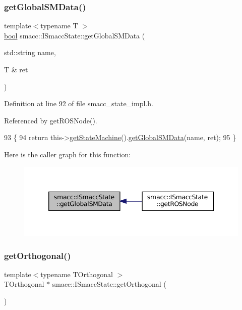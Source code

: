 \subsubsection{\texorpdfstring{get\+Global\+S\+M\+Data()}{getGlobalSMData()}}
{\footnotesize\ttfamily template$<$typename T $>$ \\
\hyperlink{classbool}{bool} smacc\+::\+I\+Smacc\+State\+::get\+Global\+S\+M\+Data (\begin{DoxyParamCaption}\item[{std\+::string}]{name,  }\item[{T \&}]{ret }\end{DoxyParamCaption})}



Definition at line 92 of file smacc\+\_\+state\+\_\+impl.\+h.



Referenced by get\+R\+O\+S\+Node().


\begin{DoxyCode}
93 \{
94     \textcolor{keywordflow}{return} this->\hyperlink{classsmacc_1_1ISmaccState_a562bb3f9a3ac16b8be71e4794c9e7523}{getStateMachine}().\hyperlink{classsmacc_1_1ISmaccStateMachine_aeda2d6813c6c428bf318a5792e014b61}{getGlobalSMData}(name, ret);
95 \}
\end{DoxyCode}
Here is the caller graph for this function\+:
\nopagebreak
\begin{figure}[H]
\begin{center}
\leavevmode
\includegraphics[width=346pt]{classsmacc_1_1ISmaccState_ad6811b03329d9e694e78bc4b1220c2c0_icgraph}
\end{center}
\end{figure}
\mbox{\label{classsmacc_1_1ISmaccState_afc5c5683cbe39964a52fc3a2553196d2}} 
\subsubsection{\texorpdfstring{get\+Orthogonal()}{getOrthogonal()}}
{\footnotesize\ttfamily template$<$typename T\+Orthogonal $>$ \\
T\+Orthogonal $\ast$ smacc\+::\+I\+Smacc\+State\+::get\+Orthogonal (\begin{DoxyParamCaption}{ }\end{DoxyParamCaption})}



